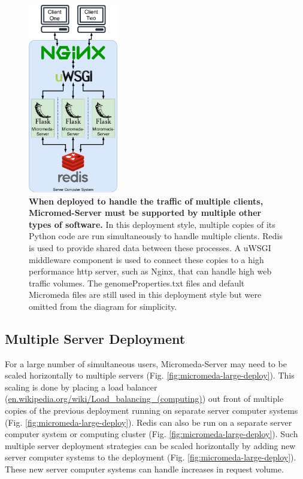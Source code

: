 \begin{figure}[!ht]
  \centering
	\includegraphics[width=0.35\textwidth]{media/micromeda-medium-deployment.pdf}
	 \caption[When deployed to handle the traffic of multiple clients, 
Micromed-Server must be supported by multiple other types of 
software.]{\textbf{When deployed to handle the traffic of multiple clients, 
Micromed-Server must be supported by multiple other types of software.} In this 
deployment style, multiple copies of its Python code are run simultaneously to 
handle multiple clients. Redis is used to provide shared data between these 
processes. A uWSGI middleware component is used to connect these copies to a 
high performance \gls{http} server, such as Nginx, that can handle high web 
traffic volumes. The genomeProperties.txt files and default Micromeda files are 
still used in this deployment style but were omitted from the diagram for 
simplicity.}
	 \label{fig:micromeda-medium-deploy}
\end{figure}

\subsection{Multiple Server Deployment} 
\label{multi-server-micromeda-deployment}

For a large number of simultaneous users, Micromeda-Server may need to be scaled 
horizontally to multiple servers (Fig. \ref{fig:micromeda-large-deploy}). This 
scaling is done by placing a load balancer 
(\href{http://en.wikipedia.org/wiki/Load_balancing_(computing)}{en.wikipedia.org/wiki/Load\_balancing\_(computing)}) 
out front of multiple copies of the previous deployment running on separate 
server computer systems (Fig. \ref{fig:micromeda-large-deploy}). Redis can also 
be run on a separate server computer system or computing cluster (Fig. 
\ref{fig:micromeda-large-deploy}). Such multiple server deployment strategies 
can be scaled horizontally by adding new server computer systems to the 
deployment (Fig. \ref{fig:micromeda-large-deploy}). These new server computer 
systems can handle increases in request volume.

